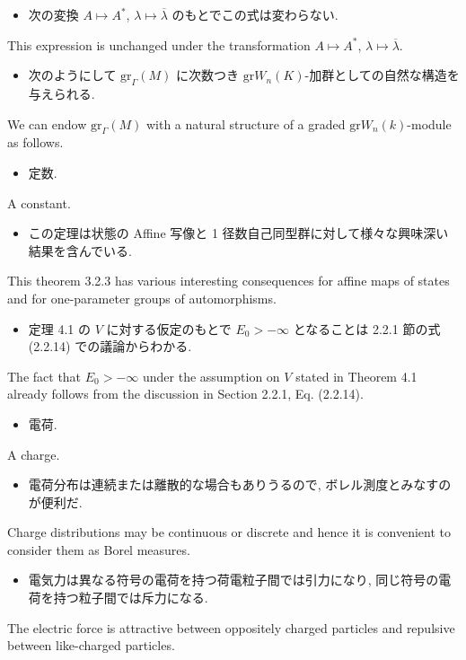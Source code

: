 \documentclass[openany, a4paper, oneside]{jsbook}
\begin{document}
\begin{itemize}
\item 次の変換 $A \mapsto A^*$, $\lambda \mapsto \overline{\lambda}$ のもとでこの式は変わらない.
\end{itemize}
This expression is unchanged under the transformation $A \mapsto A^*$, $\lambda \mapsto \overline{\lambda}$.

\begin{itemize}
\item 次のようにして $\mathrm{gr}_{\Gamma} (M)$ に次数つき $\mathrm{gr} W_n(K)$-加群としての自然な構造を与えられる.
\end{itemize}
We can endow $\mathrm{gr}_{\Gamma} (M)$ with a natural structure of a graded $\mathrm{gr} W_n(k)$-module as follows.

\begin{itemize}
\item 定数.
\end{itemize}
A constant.

\begin{itemize}
\item この定理は状態の Affine 写像と 1 径数自己同型群に対して様々な興味深い結果を含んでいる.
\end{itemize}
This theorem 3.2.3 has various interesting consequences
for affine maps of states and for one-parameter groups of automorphisms.

\begin{itemize}
\item 定理 4.1 の $V$ に対する仮定のもとで $E_0 > - \infty$ となることは 2.2.1 節の式 (2.2.14) での議論からわかる. \cite{LiebSeiringer1}
\end{itemize}
The fact that $E_0 > - \infty$ under the assumption on $V$ stated in Theorem 4.1 already follows from the
discussion in Section 2.2.1, Eq. (2.2.14).

\begin{itemize}
\item 電荷.
\end{itemize}
A charge.

\begin{itemize}
\item 電荷分布は連続または離散的な場合もありうるので, ボレル測度とみなすのが便利だ. \cite{LiebSeiringer1}
\end{itemize}
Charge distributions may be continuous or discrete and hence it is convenient to consider
them as Borel measures.

\begin{itemize}
\item 電気力は異なる符号の電荷を持つ荷電粒子間では引力になり, 同じ符号の電荷を持つ粒子間では斥力になる. \cite{LiebSeiringer1}
\end{itemize}
The electric force is attractive between oppositely charged particles and repulsive between like-charged particles.
\end{document}

